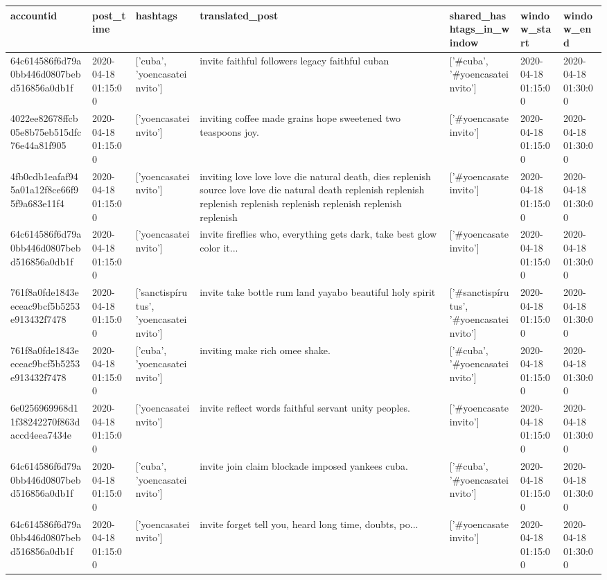 \begin{tabular}{lllllll}
\toprule
accountid & post\_time & hashtags & translated\_post & shared\_hashtags\_in\_window & window\_start & window\_end \\
\midrule
64c614586f6d79a0bb446d0807bebd516856a0db1f & 2020-04-18 01:15:00 & ['cuba', 'yoencasateinvito'] & invite faithful followers legacy faithful cuban & ['#cuba', '#yoencasateinvito'] & 2020-04-18 01:15:00 & 2020-04-18 01:30:00 \\
4022ee82678ffcb05e8b75eb515dfc76e44a81f905 & 2020-04-18 01:15:00 & ['yoencasateinvito'] & inviting coffee made grains hope sweetened two teaspoons joy. & ['#yoencasateinvito'] & 2020-04-18 01:15:00 & 2020-04-18 01:30:00 \\
4fb0cdb1eafaf945a01a12f8ce66f95f9a683e11f4 & 2020-04-18 01:15:00 & ['yoencasateinvito'] & inviting love love love die natural death, dies replenish source love love die natural death replenish replenish replenish replenish replenish replenish replenish replenish & ['#yoencasateinvito'] & 2020-04-18 01:15:00 & 2020-04-18 01:30:00 \\
64c614586f6d79a0bb446d0807bebd516856a0db1f & 2020-04-18 01:15:00 & ['yoencasateinvito'] & invite fireflies who, everything gets dark, take best glow color it... & ['#yoencasateinvito'] & 2020-04-18 01:15:00 & 2020-04-18 01:30:00 \\
761f8a0fde1843eeceac9bcf5b5253e913432f7478 & 2020-04-18 01:15:00 & ['sanctispírutus', 'yoencasateinvito'] & invite take bottle rum land yayabo beautiful holy spirit & ['#sanctispírutus', '#yoencasateinvito'] & 2020-04-18 01:15:00 & 2020-04-18 01:30:00 \\
761f8a0fde1843eeceac9bcf5b5253e913432f7478 & 2020-04-18 01:15:00 & ['cuba', 'yoencasateinvito'] & inviting make rich omee shake. & ['#cuba', '#yoencasateinvito'] & 2020-04-18 01:15:00 & 2020-04-18 01:30:00 \\
6e0256969968d11f38242270f863daccd4eea7434e & 2020-04-18 01:15:00 & ['yoencasateinvito'] & invite reflect words faithful servant unity peoples. & ['#yoencasateinvito'] & 2020-04-18 01:15:00 & 2020-04-18 01:30:00 \\
64c614586f6d79a0bb446d0807bebd516856a0db1f & 2020-04-18 01:15:00 & ['cuba', 'yoencasateinvito'] & invite join claim blockade imposed yankees cuba. & ['#cuba', '#yoencasateinvito'] & 2020-04-18 01:15:00 & 2020-04-18 01:30:00 \\
64c614586f6d79a0bb446d0807bebd516856a0db1f & 2020-04-18 01:15:00 & ['yoencasateinvito'] & invite forget tell you, heard long time, doubts, po... & ['#yoencasateinvito'] & 2020-04-18 01:15:00 & 2020-04-18 01:30:00 \\

\end{tabular}
